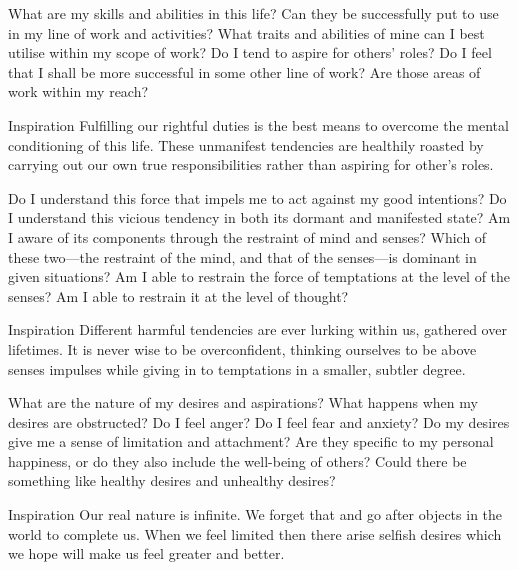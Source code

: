 \newpage
\begin{mananam}{} 
\mananamtext What are my skills and abilities in this life? Can they be successfully put to use in my line of work and activities? What traits and abilities of mine can I best utilise within my scope of work? Do I tend to aspire for others’ roles? Do I feel that I shall be more successful in some other line of work? Are those areas of work within my reach?
\end{mananam}
\WritingHand{}
\begin{inspiration}{\mananamfont Inspiration}
\mananamtext Fulfilling our rightful duties is the best means to overcome the mental conditioning of this life. These unmanifest tendencies are healthily roasted by carrying out our own true responsibilities rather than aspiring for other’s roles.
\end{inspiration}
\newpage


\newpage
\begin{mananam}{} 
\mananamtext Do I understand this force that impels me to act against my good intentions? Do I understand this vicious tendency in both its dormant and manifested state? Am I aware of its components through the restraint of mind and senses? Which of these two—the restraint of the mind, and that of the senses—is dominant in given situations? Am I able to restrain the force of temptations at the level of the senses? Am I able to restrain it at the level of thought?
\end{mananam}
\WritingHand{}
\begin{inspiration}{\mananamfont Inspiration}
\mananamtext Different harmful tendencies are ever lurking within us, gathered over lifetimes. It is never wise to be overconfident, thinking ourselves to be above senses impulses while giving in to temptations in a smaller, subtler degree.
\end{inspiration}
\newpage

\newpage
\begin{mananam}{} 
\mananamtext What are the nature of my desires and aspirations? What happens when my desires are obstructed? Do I feel anger? Do I feel fear and anxiety? Do my desires give me a sense of limitation and attachment? Are they specific to my personal happiness, or do they also include the well-being of others? Could there be something like healthy desires and unhealthy desires?
\end{mananam}
\WritingHand{}
\begin{inspiration}{\mananamfont Inspiration}
\mananamtext Our real nature is infinite. We forget that and go after objects in the world to complete us. When we feel limited then there arise selfish desires which we hope will make us feel greater and better.
\end{inspiration}
\newpage

